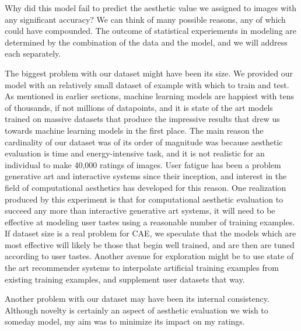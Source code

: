 \documentclass[midd]{thesis}
\begin{document}
Why did this model fail to predict the aesthetic value we assigned to images with any significant accuracy? We can think of many possible reasons, any of which could have compounded. The outcome of statistical experiements in modeling are determined by the combination of the data and the model, and we will address each separately.

The biggest problem with our dataset might have been its size. We provided our model with an relatively small dataset of example with which to train and test. As mentioned in earlier sections, machine learning models are happiest with tens of thousands, if not millions of datapoints, and it is state of the art models trained on massive datasets that produce the impressive results that drew us towards machine learning models in the first place. The main reason the cardinality of our dataset was of its order of magnitude was because aesthetic evaluation is time and energy-intensive task, and it is not realistic for an individual to make 40,000 ratings of images. User fatigue has been a problem generative art and interactive systems since their inception, and interest in the field of computational aesthetics has developed for this reason. One realization produced by this experiment is that for computational aesthetic evaluation to succeed any more than interactive generative art systems, it will need to be effective at modeling user tastes using a reasonable number of training examples. If dataset size is a real problem for CAE, we speculate that the models which are most effective will likely be those that begin well trained, and are then are tuned according to user tastes. Another avenue for exploration might be to use state of the art recommender systems to interpolate artificial training examples from existing training examples, and supplement user datasets that way.

Another problem with our dataset may have been its internal consistency. Although novelty is certainly an aspect of aesthetic evaluation we wish to someday model, my aim was to minimize its impact on my ratings.




\end{document}
